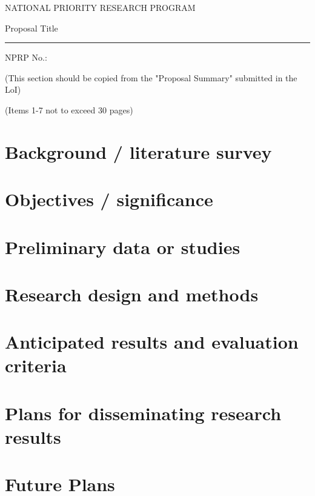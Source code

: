 \documentclass[12pt,letterpaper]{article}
\begin{document}
\begin{titlepage}
\begin{center}
\fontsize{11}{15}
\selectfont
NATIONAL PRIORITY RESEARCH PROGRAM

\vspace{4.5cm}

\fontsize{40}{48}
\selectfont
Proposal Title
\vspace{0.4cm}
{\color{blue2}\hrule}
\vspace{0.4cm}
\fontsize{22}{26}
\selectfont
NPRP No.:

\end{center}
\end{titlepage}

\rfoot{}
\renewcommand\contentsname{Table of Content}
\tableofcontents

\newpage
\setcounter{page}{1}

(This section should be copied from the "Proposal Summary" submitted in the LoI)

\bigskip
{}
(Items 1-7 not to exceed 30 pages)


\section{Background / literature survey}

\section{Objectives / significance}

\section{Preliminary data or studies}

\section{Research design and methods}

\section{Anticipated results and evaluation criteria}

\section{Plans for disseminating research results}

\section{Future Plans}


\newpage

\nocite{Nobody06}


\end{document}
